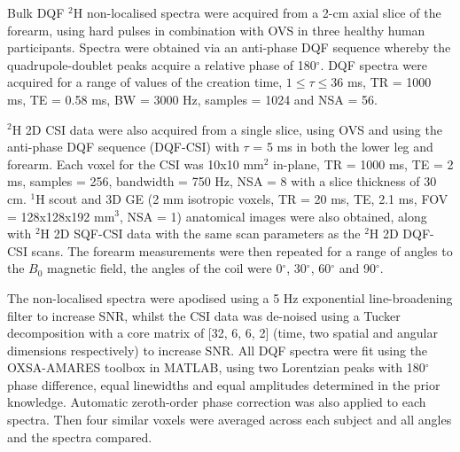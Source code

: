 Bulk \ac{DQF} $^2$H non-localised spectra were acquired from a 2-cm axial slice of the forearm, using hard pulses in combination with \ac{OVS} in three healthy human participants. Spectra were obtained via an anti-phase \ac{DQF} sequence \cite{Sharf1995DetectionNMR-Spectroscopy} whereby the quadrupole-doublet peaks acquire a relative phase of 180$^\circ$. \ac{DQF} spectra were acquired for a range of values of the creation time, $1\leq\tau\leq36$ ms, \ac{TR} = 1000 ms, \ac{TE} = 0.58 ms, \ac{BW} = 3000 Hz, samples = 1024 and NSA = 56.

$^2$H 2D \ac{CSI} data were also acquired from a single slice, using \ac{OVS} and using the anti-phase \ac{DQF} sequence (\ac{DQF}-\ac{CSI}) with $\tau$ = 5 ms in both the lower leg and forearm. Each voxel for the \ac{CSI} was 10x10 mm$^2$ in-plane, \ac{TR} = 1000 ms, \ac{TE} = 2 ms, samples = 256, bandwidth = 750 Hz, NSA = 8 with a slice thickness of 30 cm. $^1$H scout and 3D \ac{GE} (2 mm isotropic voxels, \ac{TR} = 20 ms, \ac{TE}, 2.1 ms, \ac{FOV} = 128x128x192 mm$^3$, NSA = 1) anatomical images were also obtained, along with $^2$H 2D \ac{SQF}-\ac{CSI} data with the same scan parameters as the $^2$H 2D \ac{DQF}-\ac{CSI} scans. The forearm measurements were then repeated for a range of angles to the $B_0$ magnetic field, the angles of the coil were 0$^\circ$, 30$^\circ$, 60$^\circ$ and 90$^\circ$. 

The non-localised spectra were apodised using a 5 Hz exponential line-broadening filter to increase \ac{SNR}, whilst the \ac{CSI} data was de-noised using a Tucker decomposition \cite{Bader2007EfficientTensors} with a core matrix of [32, 6, 6, 2] (time, two spatial and angular dimensions respectively) to increase \ac{SNR}. All \ac{DQF} spectra were fit using the OXSA-AMARES \cite{Purvis2017OXSA:MATLAB} toolbox in MATLAB, using two Lorentzian peaks with 180$^\circ$ phase difference, equal linewidths and equal amplitudes determined in the prior knowledge. Automatic zeroth-order phase correction was also applied to each spectra. Then four similar voxels were averaged across each subject and all angles and the spectra compared.

